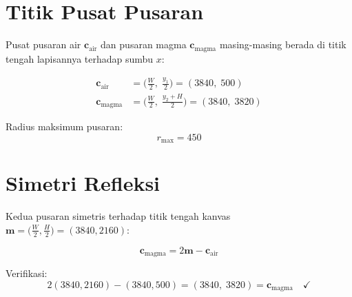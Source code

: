 \documentclass[11pt]{article}
\begin{document}
\section{Titik Pusat Pusaran}

Pusat pusaran air $\mathbf{c}_{\text{air}}$ dan pusaran magma
$\mathbf{c}_{\text{magma}}$ masing-masing berada di titik tengah
lapisannya terhadap sumbu $x$:

\begin{align}
\mathbf{c}_{\text{air}}   &= \bigl( \tfrac{W}{2},\; \tfrac{y_1}{2} \bigr)
                            = (3840,\; 500) \\
\mathbf{c}_{\text{magma}} &= \bigl( \tfrac{W}{2},\; \tfrac{y_2 + H}{2} \bigr)
                            = (3840,\; 3820)
\end{align}

Radius maksimum pusaran:
\begin{equation}
r_{\max} = 450
\end{equation}

\section{Simetri Refleksi}

Kedua pusaran simetris terhadap titik tengah kanvas
$\mathbf{m} = \bigl( \tfrac{W}{2}, \tfrac{H}{2} \bigr) = (3840, 2160)$:

\begin{equation}
\mathbf{c}_{\text{magma}} = 2\mathbf{m} - \mathbf{c}_{\text{air}}
\end{equation}

Verifikasi:
\begin{equation}
2(3840, 2160) - (3840, 500) = (3840,\; 3820) = \mathbf{c}_{\text{magma}} \quad \checkmark
\end{equation}
\end{document}
